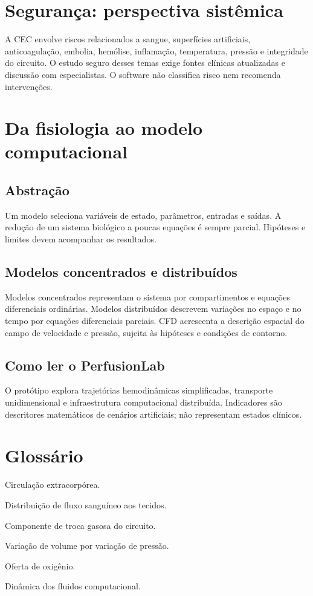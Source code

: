 \documentclass[11pt,a4paper,oneside]{book}
\begin{document}
\chapter{Segurança: perspectiva sistêmica}
A CEC envolve riscos relacionados a sangue, superfícies artificiais, anticoagulação, embolia, hemólise, inflamação, temperatura, pressão e integridade do circuito. O estudo seguro desses temas exige fontes clínicas atualizadas e discussão com especialistas. O software não classifica risco nem recomenda intervenções.

\chapter{Da fisiologia ao modelo computacional}
\section{Abstração}
Um modelo seleciona variáveis de estado, parâmetros, entradas e saídas. A redução de um sistema biológico a poucas equações é sempre parcial. Hipóteses e limites devem acompanhar os resultados.

\section{Modelos concentrados e distribuídos}
Modelos concentrados representam o sistema por compartimentos e equações diferenciais ordinárias. Modelos distribuídos descrevem variações no espaço e no tempo por equações diferenciais parciais. CFD acrescenta a descrição espacial do campo de velocidade e pressão, sujeita às hipóteses e condições de contorno.

\section{Como ler o PerfusionLab}
O protótipo explora trajetórias hemodinâmicas simplificadas, transporte unidimensional e infraestrutura computacional distribuída. Indicadores são descritores matemáticos de cenários artificiais; não representam estados clínicos.

\chapter{Glossário}
\begin{description}[style=nextline]
\item[CEC] Circulação extracorpórea.
\item[Perfusão] Distribuição de fluxo sanguíneo aos tecidos.
\item[Oxigenador] Componente de troca gasosa do circuito.
\item[Complacência] Variação de volume por variação de pressão.
\item[DO$_2$] Oferta de oxigênio.
\item[CFD] Dinâmica dos fluidos computacional.
\end{description}
\backmatter
\end{document}

